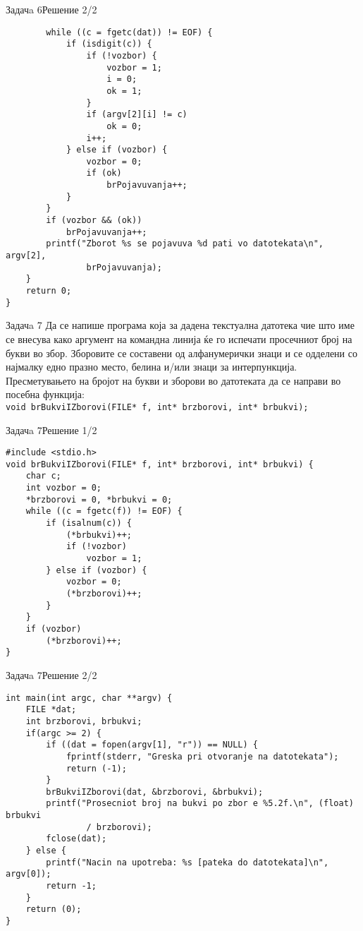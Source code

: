 \begin{frame}[fragile]{Задачa 6}{Решение 2/2}
\begin{lstlisting}
        while ((c = fgetc(dat)) != EOF) {
            if (isdigit(c)) {
                if (!vozbor) {
                    vozbor = 1;
                    i = 0;
                    ok = 1;
                }
                if (argv[2][i] != c)
                    ok = 0;
                i++;
            } else if (vozbor) {
                vozbor = 0;
                if (ok)
                    brPojavuvanja++;
            }
        }
        if (vozbor && (ok))
            brPojavuvanja++;
        printf("Zborot %s se pojavuva %d pati vo datotekata\n", argv[2],
                brPojavuvanja);
    }
    return 0;
}

\end{lstlisting}
\end{frame}

\begin{frame}{Задачa 7}
Да се напише програма која за дадена текстуална датотека чие што име се внесува
како аргумент на командна линија ќе го испечати просечниот број на  букви во
збор. Зборовите се составени од алфанумерички знаци и се одделени со најмалку
едно празно место, белина и/или знаци за интерпункција. Пресметувањето на бројот
на букви и зборови во датотеката да се направи во посебна функција:\\[.5cm]

\texttt{\scriptsize{void brBukviIZborovi(FILE* f, int* brzborovi, int*
brbukvi);}}

\end{frame}

\begin{frame}[fragile]{Задачa 7}{Решение 1/2}
\begin{lstlisting}
#include <stdio.h>
void brBukviIZborovi(FILE* f, int* brzborovi, int* brbukvi) {
    char c;
    int vozbor = 0;
    *brzborovi = 0, *brbukvi = 0;
    while ((c = fgetc(f)) != EOF) {
        if (isalnum(c)) {
            (*brbukvi)++;
            if (!vozbor)
                vozbor = 1;
        } else if (vozbor) {
            vozbor = 0;
            (*brzborovi)++;
        }
    }
    if (vozbor)
        (*brzborovi)++;
}
\end{lstlisting}
\end{frame}

\begin{frame}[fragile]{Задачa 7}{Решение 2/2}
\begin{lstlisting}
int main(int argc, char **argv) {
    FILE *dat;
    int brzborovi, brbukvi;
    if(argc >= 2) {
        if ((dat = fopen(argv[1], "r")) == NULL) {
            fprintf(stderr, "Greska pri otvoranje na datotekata");
            return (-1);
        }
        brBukviIZborovi(dat, &brzborovi, &brbukvi);
        printf("Prosecniot broj na bukvi po zbor e %5.2f.\n", (float) brbukvi
                / brzborovi);
        fclose(dat);
    } else {
        printf("Nacin na upotreba: %s [pateka do datotekata]\n", argv[0]);
        return -1;
    }
    return (0);
}
\end{lstlisting}
\end{frame}

